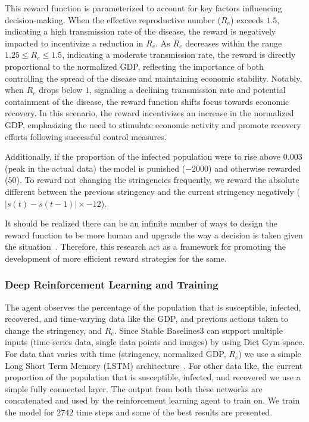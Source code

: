 \documentclass[tikz,fleqn,12pt]{wlscirep}
\begin{document}
This reward function is parameterized to account for key factors influencing decision-making. When the effective reproductive number ($R_e$) exceeds $1.5$, indicating a high transmission rate of the disease, the reward is negatively impacted to incentivize a reduction in $R_e$. As $R_e$ decreases within the range $1.25 \leq R_e \leq 1.5$, indicating a moderate transmission rate, the reward is directly proportional to the normalized GDP, reflecting the importance of both controlling the spread of the disease and maintaining economic stability. Notably, when $R_e$ drops below $1$, signaling a declining transmission rate and potential containment of the disease, the reward function shifts focus towards economic recovery. In this scenario, the reward incentivizes an increase in the normalized GDP, emphasizing the need to stimulate economic activity and promote recovery efforts following successful control measures.

Additionally, if the proportion of the infected population were to rise above 0.003 (peak in the actual data) the model is punished ($-2000$) and otherwise rewarded ($50$). To reward not changing the stringencies frequently, we reward the absolute different between the previous stringency and the current stringency negatively ($|s(t) - s(t-1)| \times -12$).

It should be realized there can be an infinite number of ways to design the reward function to be more human and upgrade the way a decision is taken given the situation~\cite{AWSDeepRacer}. Therefore, this research act as a  framework for promoting the development of more efficient reward strategies for the same. 

\subsubsection{Deep Reinforcement Learning and Training}\label{drl_and_training}
The agent observes the percentage of the population that is susceptible, infected, recovered, and time-varying data like the GDP, and previous actions taken to change the stringency, and $R_e$. Since Stable Baselines3 can support multiple inputs (time-series data, single data points and images) by using Dict Gym space. For data that varies with time (stringency, normalized GDP, $R_e$) we use a simple Long Short Term Memory (LSTM) architecture~\cite{LSTM}. For other data like, the current proportion of the population that is susceptible, infected, and recovered we use a simple fully connected layer. The output from both these networks are concatenated and used by the reinforcement learning agent to train on. We train the model for $2742$ time steps and some of the best results are presented.
\end{document}
